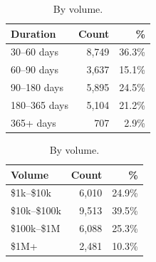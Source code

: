 \documentclass[11pt,twocolumn]{article}
\begin{document}
\begin{table}[h]
\centering
\footnotesize
\begin{minipage}[t]{0.48\columnwidth}
    \centering
    \setlength{\tabcolsep}{3pt}
    \begin{tabular}{lrr}
    \toprule
    \textbf{Duration} & \textbf{Count} & \textbf{\%} \\
    \midrule
    30--60 days   & 8,749 & 36.3\% \\
    60--90 days   & 3,637 & 15.1\% \\
    90--180 days  & 5,895 & 24.5\% \\
    180--365 days & 5,104 & 21.2\% \\
    365+ days     & 707   & 2.9\%  \\
    \bottomrule
    \end{tabular}
    \vspace*{\fill}
    \caption{By duration.}
    \label{tab:duration}
\end{minipage}
\hfill
\begin{minipage}[t]{0.48\columnwidth}
    \centering
    \setlength{\tabcolsep}{3pt}
    \begin{tabular}{lrr}
    \toprule
    \textbf{Volume} & \textbf{Count} & \textbf{\%} \\
    \midrule
    \$1k--\$10k   & 6,010 & 24.9\% \\
    \$10k--\$100k & 9,513 & 39.5\% \\
    \$100k--\$1M  & 6,088 & 25.3\% \\
    \$1M+         & 2,481 & 10.3\% \\
    \bottomrule
    \end{tabular}
    \vspace*{\fill}
    \caption{By volume.}
    \label{tab:volume}
\end{minipage}
\end{table}
\end{document}
